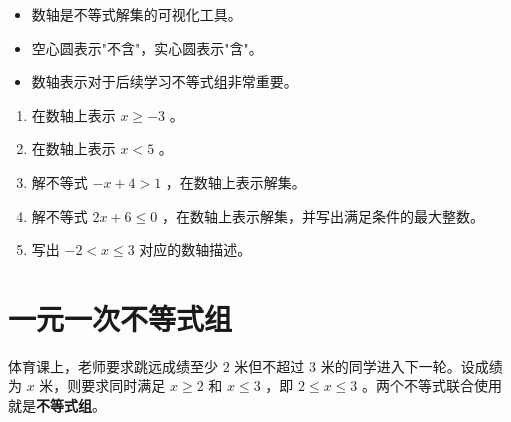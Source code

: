 \begin{keytakeaway}


\begin{itemize}
  \item 数轴是不等式解集的可视化工具。
  \item 空心圆表示"不含"，实心圆表示"含"。
  \item 数轴表示对于后续学习不等式组非常重要。
\end{itemize}


\end{keytakeaway}

\begin{practice}


\begin{enumerate}
  \item 在数轴上表示 $x \geq -3$ 。
  \item 在数轴上表示 $x < 5$ 。
  \item 解不等式 $-x + 4 > 1$ ，在数轴上表示解集。
  \item 解不等式 $2x + 6 \leq 0$ ，在数轴上表示解集，并写出满足条件的最大整数。
  \item 写出 $-2 < x \leq 3$ 对应的数轴描述。
\end{enumerate}


\end{practice}

\section*{一元一次不等式组}


\begin{explore}


体育课上，老师要求跳远成绩至少 $2$ 米但不超过 $3$ 米的同学进入下一轮。设成绩为 $x$ 米，则要求同时满足 $x \geq 2$ 和 $x \leq 3$ ，即 $2 \leq x \leq 3$ 。两个不等式联合使用就是\textbf{不等式组}。

\end{explore}

